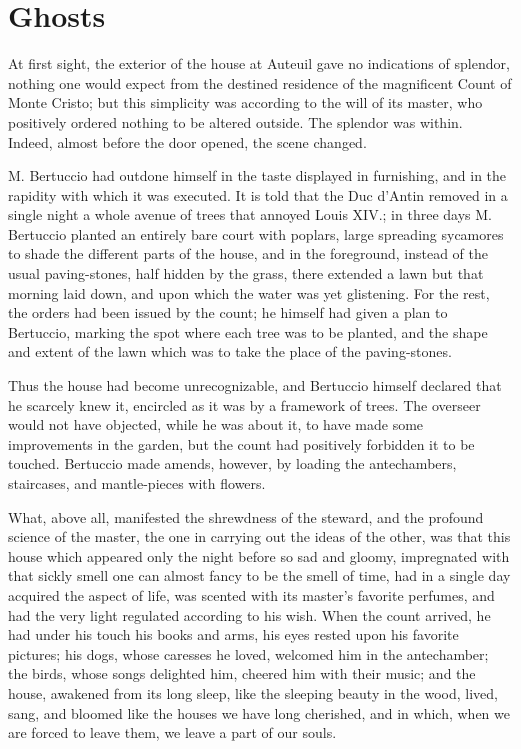 \chapter{Ghosts}

At first sight, the exterior of the house at Auteuil gave no
indications of splendor, nothing one would expect from the destined
residence of the magnificent Count of Monte Cristo; but this simplicity
was according to the will of its master, who positively ordered nothing
to be altered outside. The splendor was within. Indeed, almost before
the door opened, the scene changed.

M. Bertuccio had outdone himself in the taste displayed in furnishing,
and in the rapidity with which it was executed. It is told that the Duc
d’Antin removed in a single night a whole avenue of trees that annoyed
Louis XIV.; in three days M. Bertuccio planted an entirely bare court
with poplars, large spreading sycamores to shade the different parts of
the house, and in the foreground, instead of the usual paving-stones,
half hidden by the grass, there extended a lawn but that morning laid
down, and upon which the water was yet glistening. For the rest, the
orders had been issued by the count; he himself had given a plan to
Bertuccio, marking the spot where each tree was to be planted, and the
shape and extent of the lawn which was to take the place of the
paving-stones.

Thus the house had become unrecognizable, and Bertuccio himself
declared that he scarcely knew it, encircled as it was by a framework
of trees. The overseer would not have objected, while he was about it,
to have made some improvements in the garden, but the count had
positively forbidden it to be touched. Bertuccio made amends, however,
by loading the antechambers, staircases, and mantle-pieces with
flowers.

What, above all, manifested the shrewdness of the steward, and the
profound science of the master, the one in carrying out the ideas of
the other, was that this house which appeared only the night before so
sad and gloomy, impregnated with that sickly smell one can almost fancy
to be the smell of time, had in a single day acquired the aspect of
life, was scented with its master’s favorite perfumes, and had the very
light regulated according to his wish. When the count arrived, he had
under his touch his books and arms, his eyes rested upon his favorite
pictures; his dogs, whose caresses he loved, welcomed him in the
antechamber; the birds, whose songs delighted him, cheered him with
their music; and the house, awakened from its long sleep, like the
sleeping beauty in the wood, lived, sang, and bloomed like the houses
we have long cherished, and in which, when we are forced to leave them,
we leave a part of our souls.

